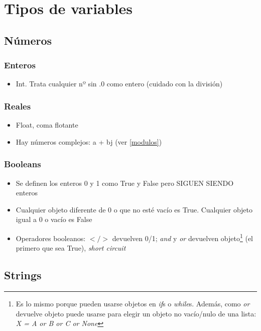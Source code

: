 \section{Tipos de variables}

	\subsection {Números}
		\subsubsection {Enteros}
			\begin{itemize}
			\item Int. Trata cualquier nº sin .0 como entero (cuidado con la división)
			\end{itemize}
		\subsubsection {Reales}
			\begin{itemize}
			\item Float, coma flotante
			\item Hay números complejos: a + bj (ver \ref{modulos})
			\end{itemize}
		\subsubsection {Booleans}
			\begin{itemize}
			\item Se definen los enteros 0 y 1 como True y False pero SIGUEN SIENDO enteros
			\item Cualquier objeto diferente de 0 o que no esté vacío es True. Cualquier objeto igual a 0 o vacío es False
			\item Operadores booleanos: $</>$ devuelven 0/1; \textit{and} y \textit{or} devuelven objeto\footnote{Es lo mismo porque pueden usarse objetos en \textit{if}s o \textit{while}s. Además, como \textit{or} devuelve objeto puede usarse para elegir un objeto no vacío/nulo de una lista: \textit{X = A or B or C or None}} (el primero que sea True), \textit{short circuit} 
			\end{itemize}
	\subsection {Strings} \label{strings}


